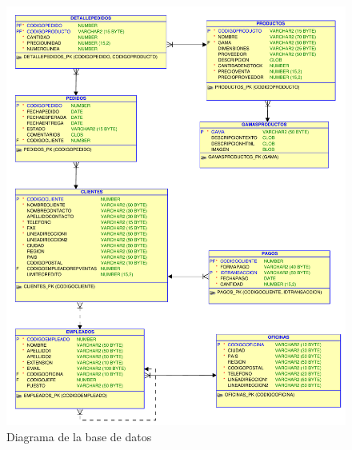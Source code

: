 \begin{figure}[h]
  \begin{center}
    \includegraphics[width=.9\textwidth]{./jardineria.pdf}
  \end{center}
  \caption{Diagrama de la base de datos}\label{fig:esquema}
\end{figure}






